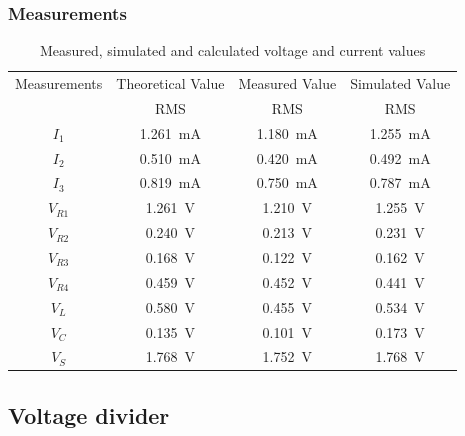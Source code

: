\documentclass[letterpaper]{article}
\begin{document}
\subsubsection{Measurements}
\begin{table}[H]
    \centering
    \begin{tabular}{|c|c|c|c|}
        \hline
        Measurements & Theoretical Value & Measured Value & Simulated Value\\
         & RMS & RMS & RMS\\\hline
        $I_1$ & \SI{1.261}{\milli\ampere} & \SI{1.180}{\milli\ampere} & \SI{1.255}{\milli\ampere}\\\hline 
        $I_2$ & \SI{0.510}{\milli\ampere} & \SI{0.420}{\milli\ampere} & \SI{0.492}{\milli\ampere}\\\hline 
        $I_3$ & \SI{0.819}{\milli\ampere} & \SI{0.750}{\milli\ampere} & \SI{0.787}{\milli\ampere}\\\hline 
        $V_{R1}$ & \SI{1.261}{\volt} & \SI{1.210}{\volt} & \SI{1.255}{\volt}\\\hline 
        $V_{R2}$ & \SI{0.240}{\volt} & \SI{0.213}{\volt} & \SI{0.231}{\volt}\\\hline 
        $V_{R3}$ & \SI{0.168}{\volt} & \SI{0.122}{\volt} & \SI{0.162}{\volt}\\\hline 
        $V_{R4}$ & \SI{0.459}{\volt} & \SI{0.452}{\volt} & \SI{0.441}{\volt}\\\hline 
        $V_L$ & \SI{0.580}{\volt} & \SI{0.455}{\volt} & \SI{0.534}{\volt}\\\hline 
        $V_C$ & \SI{0.135}{\volt} & \SI{0.101}{\volt} & \SI{0.173}{\volt}\\\hline 
        $V_S$ & \SI{1.768}{\volt} & \SI{1.752}{\volt} & \SI{1.768}{\volt}\\\hline 
    \end{tabular}
    \caption{Measured, simulated and calculated voltage and current values}
\end{table}
\subsection{Voltage divider}
\end{document}

